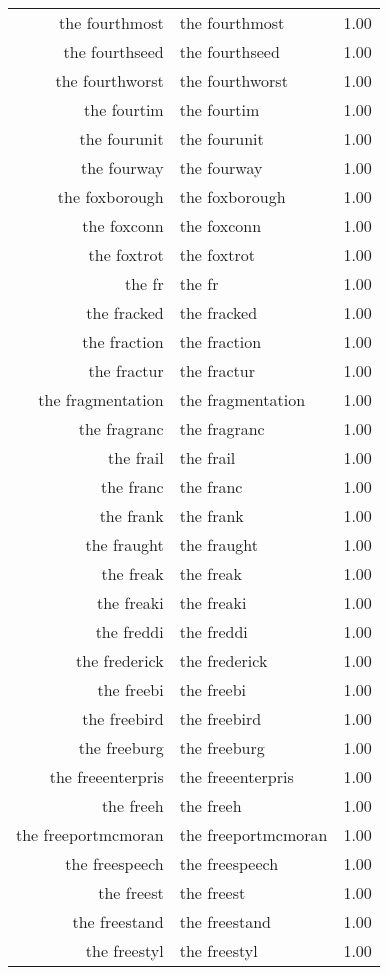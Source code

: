 \begin{table}[ht]
\begin{tabular}{rlr}
  the fourthmost & the fourthmost & 1.00 \\ 
  the fourthseed & the fourthseed & 1.00 \\ 
  the fourthworst & the fourthworst & 1.00 \\ 
  the fourtim & the fourtim & 1.00 \\ 
  the fourunit & the fourunit & 1.00 \\ 
  the fourway & the fourway & 1.00 \\ 
  the foxborough & the foxborough & 1.00 \\ 
  the foxconn & the foxconn & 1.00 \\ 
  the foxtrot & the foxtrot & 1.00 \\ 
  the fr & the fr & 1.00 \\ 
  the fracked & the fracked & 1.00 \\ 
  the fraction & the fraction & 1.00 \\ 
  the fractur & the fractur & 1.00 \\ 
  the fragmentation & the fragmentation & 1.00 \\ 
  the fragranc & the fragranc & 1.00 \\ 
  the frail & the frail & 1.00 \\ 
  the franc & the franc & 1.00 \\ 
  the frank & the frank & 1.00 \\ 
  the fraught & the fraught & 1.00 \\ 
  the freak & the freak & 1.00 \\ 
  the freaki & the freaki & 1.00 \\ 
  the freddi & the freddi & 1.00 \\ 
  the frederick & the frederick & 1.00 \\ 
  the freebi & the freebi & 1.00 \\ 
  the freebird & the freebird & 1.00 \\ 
  the freeburg & the freeburg & 1.00 \\ 
  the freeenterpris & the freeenterpris & 1.00 \\ 
  the freeh & the freeh & 1.00 \\ 
  the freeportmcmoran & the freeportmcmoran & 1.00 \\ 
  the freespeech & the freespeech & 1.00 \\ 
  the freest & the freest & 1.00 \\ 
  the freestand & the freestand & 1.00 \\ 
  the freestyl & the freestyl & 1.00 \\ 

\end{tabular}
\end{table}
